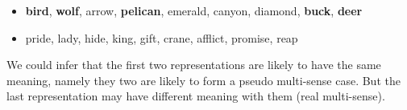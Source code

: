 \documentclass[landscape,final,b0paper,fontscale=0.285]{baposter}
\begin{document}
\begin{poster}
{\begin{itemize}
\item \textbf{bird}, \textbf{wolf}, arrow, \textbf{pelican}, emerald, canyon, diamond, \textbf{buck}, \textbf{deer}
\item pride, lady, hide, king, gift, crane, afflict, promise, reap
\end{itemize}
\begin{spacing}{0.5} \end{spacing}
We could infer that the first two representations are likely to have the same meaning, namely they two are likely to form a pseudo multi-sense case. But the last representation may have different meaning with them (real multi-sense).
   \vspace{0.3em}
  }

\end{poster}
\end{document}

